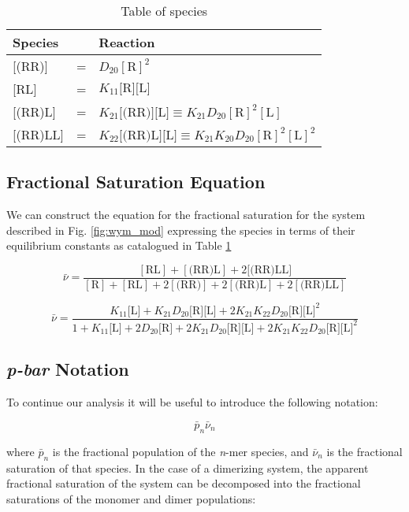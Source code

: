 \begin{table}[h]
\centering
\begin{tabular}{lcl}
\toprule
Species & & Reaction \\
\midrule
{[(RR)]} & = & \(D_{20}[\text{R}]^2\) \\
{[RL]} & = & \(K_{11}\text{[R][L]}\) \\
{[(RR)L]} & = & \(K_{21}\text{[(RR)][L]} \equiv K_{21} D_{20}[\text{R}]^2[\text{L}]\) \\
{[(RR)LL]} & = & \(K_{22}\text{[(RR)L][L]} \equiv K_{21}K_{20}D_{20}[\text{R}]^2[\text{L}]^2\) \\
\bottomrule
\end{tabular}
\caption{Table of species}
\label{tab:spec}
\end{table}


\subsection{Fractional Saturation Equation}
We can construct the equation for the fractional saturation for the system described in Fig. \ref{fig:wym_mod} expressing the species in terms of their equilibrium constants as catalogued in Table \ref{tab:spec}


\begin{equation}
\bar{\nu}=\frac{[\text{RL}] + [\text{(RR)L}] + 2[\text{(RR)LL]}}{[\text{R}]+ [\text{RL}] + 2[\text{(RR)}] + 2[\text{(RR)L}] + 2[\text{(RR)LL}]}
\end{equation}

\begin{equation} \label{eq:wym_fsat}
\bar{\nu}=\frac{K_{11}\text{[L]} + K_{21}D_{20}\text{[R][L]} + 2 K_{21} K_{22} D_{20}\text{[R]}\text{[L]}^2}{1 + K_{11}\text{[L]} + 2 D_{20}\text{[R]} + 2 K_{21} D_{20} \text{[R][L]} + 2 K_{21} K_{22} D_{20} \text{[R]}\text{[L]}^2}
\end{equation}

\subsection{\emph{p-bar} Notation}

To continue our analysis it will be useful to introduce the following notation:

\begin{equation}
	\bar{p}_n \bar{\nu}_{n}
\end{equation}

where \(\bar{p}_n\) is the fractional population of the \emph{n}-mer species, and \(\bar{\nu}_n\) is the fractional saturation of that species. In the case of a dimerizing system, the apparent fractional saturation of the system can be decomposed into the fractional saturations of the monomer and dimer populations:


